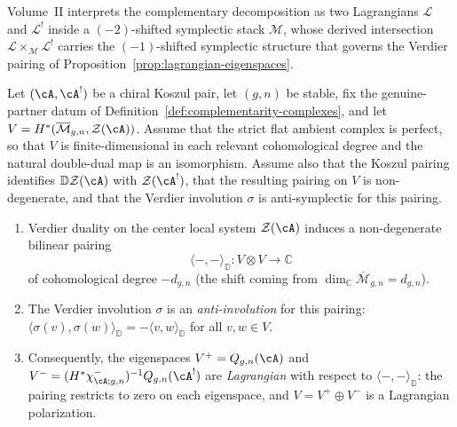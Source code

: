\begin{remark}
\label{rem:theorem-c-lagrangian}
Volume~II interprets the complementary decomposition as two
Lagrangians $\mathcal{L}$ and $\mathcal{L}^!$ inside a
$(-2)$-shifted symplectic stack $\mathcal{M}$, whose derived
intersection $\mathcal{L} \times_{\mathcal{M}} \mathcal{L}^!$
carries the $(-1)$-shifted symplectic structure that governs the
Verdier pairing of Proposition~\ref{prop:lagrangian-eigenspaces}.
\end{remark}

\begin{proposition}
\label{prop:lagrangian-eigenspaces}
Let $(\cA, \cA^!)$ be a chiral Koszul pair, let \((g,n)\) be stable,
fix the genuine-partner datum of
Definition~\ref{def:complementarity-complexes}, and let
$V = H^*(\overline{\mathcal{M}}_{g,n}, \mathcal{Z}(\cA))$.
Assume that the strict flat ambient complex is perfect, so that
$V$ is finite-dimensional in each relevant cohomological degree and
the natural double-dual map is an isomorphism. Assume also that the
Koszul pairing identifies
$\mathbb{D}\mathcal Z(\cA)$ with $\mathcal Z(\cA^!)$, that the resulting
pairing on $V$ is non-degenerate, and that the Verdier involution
$\sigma$ is anti-symplectic for this pairing.
\begin{enumerate}[label=\textup{(\roman*)}]
\item Verdier duality on the center local system $\mathcal{Z}(\cA)$
 induces a non-degenerate bilinear pairing
 \[
 \langle -, - \rangle_{\mathbb{D}} \colon V \otimes V \to \mathbb{C}
 \]
 of cohomological degree $-d_{g,n}$ \textup{(}the shift coming from
 $\dim_{\mathbb{C}} \overline{\mathcal{M}}_{g,n}=d_{g,n}$\textup{)}.
\item The Verdier involution $\sigma$ is an \emph{anti-involution}
 for this pairing:
 $\langle \sigma(v), \sigma(w) \rangle_{\mathbb{D}} = -\langle v, w \rangle_{\mathbb{D}}$
 for all $v, w \in V$.
\item Consequently, the eigenspaces
 $V^+ = Q_{g,n}(\cA)$ and
 $V^-=(H^*\chi^-_{\cA;g,n})^{-1}Q_{g,n}(\cA^!)$
 are \emph{Lagrangian} with respect to
 $\langle -, - \rangle_{\mathbb{D}}$: the pairing restricts to
 zero on each eigenspace, and $V = V^+ \oplus V^-$ is a Lagrangian
 polarization.
\end{enumerate}
\end{proposition}

